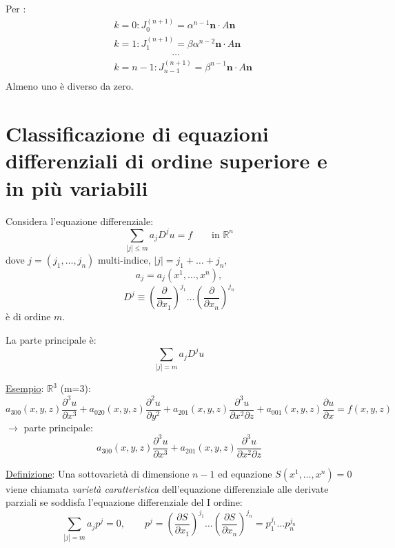 \documentclass[a4paper,11pt]{report}
\newcommand{\vect}[1]{\boldsymbol{#1}}
\newcommand{\R}{\mathbb{R}}
\newcommand{\Rn}{\mathbb{R}^n}
\begin{document}
Per :
\[
\begin{aligned}
&k=0 : J_0^{(n+1)} = \alpha^{n-1}\vect{n}\cdot A\vect{n}\\
&k=1 : J_1^{(n+1)} = \beta\alpha^{n-2}\vect{n}\cdot A\vect{n}\\
&\qquad\qquad\qquad\dots\\
&k=n-1 : J_{n-1}^{(n+1)} = \beta^{n-1}\vect{n}\cdot A\vect{n}\\
\end{aligned}
\]
Almeno uno \`e diverso da zero.

\section{Classificazione di equazioni differenziali di ordine superiore e in pi\`u variabili}

Considera l'equazione differenziale:
\begin{equation}
\sum_{|j|\leq m}a_j D^j u = f \qquad \text{in } \Rn
\label{2.125}
\end{equation}
dove $ j=(j_1,\dots,j_n)$ multi-indice, $|j| = j_1 + \dots + j_n$,
\[
a_j=a_j(x^1,\dots,x^n),
\]
\[
D^j \equiv \left(\frac{\partial}{\partial x_1}\right)^{j_1} \dots \left(\frac{\partial}{\partial x_n}\right)^{j_n}
\]
\`e di ordine $m$.

La parte principale \`e: 
\begin{equation}
\sum_{|j| = m} a_j D^j u 
\label{2.126}
\end{equation}

\medskip

\underline{Esempio}: $\R^3$ (m=3): 
\begin{equation}
a_{300}(x,y,z)\frac{\partial ^3 u}{\partial x^3} + a_{020}(x,y,z)\frac{\partial ^2 u}{\partial y^2} + a_{201}(x,y,z)\frac{\partial ^3 u}{\partial x^2\partial z} + a_{001}(x,y,z)\frac{\partial u}{\partial x} = f(x,y,z)
\tag{$*$}
\label{eq*}
\end{equation}
$\rightarrow$ parte principale:
\[
a_{300}(x,y,z)\frac{\partial ^3 u}{\partial x^3} + a_{201}(x,y,z)\frac{\partial ^3 u}{\partial x^2\partial z}
\]

\medskip

\underline{Definizione}: Una sottovariet\`a di dimensione $n-1$ ed equazione $S(x^1,\dots, x^n)=0$ viene chiamata \emph{variet\`a caratteristica} dell'equazione differenziale alle derivate parziali se soddisfa l'equazione differenziale del I ordine:
\begin{equation}
\sum_{|j| =m} a_j p^j=0 , \qquad p^j=\left(\frac{\partial S}{\partial x_1}\right)^{j_1} \ldots \left(\frac{\partial S}{\partial x_n}\right)^{j_n} = p_1^{j_1} \ldots p_n^{j_n} 
\label{2.127}
\end{equation}
\end{document}

